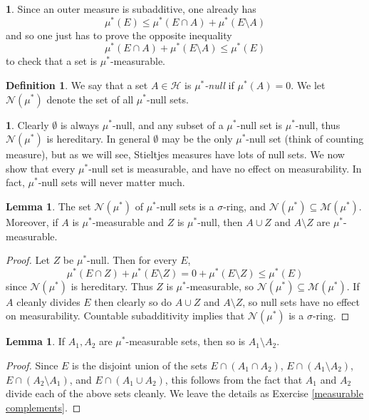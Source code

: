 \documentclass[12pt]{book}
\newcommand{\dfn}[1]{\emph{#1}\index{#1}}
\theoremstyle{definition}
\newtheorem{lemma}[theorem]{Lemma}
\newtheorem{subsec}[theorem]{}
\newtheorem{definition}[theorem]{Definition}
\begin{document}
\begin{subsec}
Since an outer measure is subadditive, one already has
$$\mu^*(E) \leq \mu^*(E \cap A) + \mu^*(E \setminus A)$$
and so one just has to prove the opposite inequality
\begin{equation}
\label{Caratheodory inequality}
\mu^*(E \cap A) + \mu^*(E \setminus A) \leq \mu^*(E)
\end{equation}
to check that a set is $\mu^*$-measurable.
\end{subsec}

\begin{definition}
We say that a set $A \in \mathcal H$ is \dfn{$\mu^*$-null} if $\mu^*(A) = 0$.
We let $\mathcal N(\mu^*)$ denote the set of all $\mu^*$-null sets.
\end{definition}

\begin{subsec}
Clearly $\emptyset$ is always $\mu^*$-null, and any subset of a $\mu^*$-null set is $\mu^*$-null, thus $\mathcal N(\mu^*)$ is hereditary.
In general $\emptyset$ may be the only $\mu^*$-null set (think of counting measure), but as we will see, Stieltjes measures have lots of null sets.
We now show that every $\mu^*$-null set is measurable, and have no effect on measurability.
In fact, $\mu^*$-null sets will never matter much.
\end{subsec}

\begin{lemma}
The set $\mathcal N(\mu^*)$ of $\mu^*$-null sets is a $\sigma$-ring, and $\mathcal N(\mu^*) \subseteq \mathcal M(\mu^*)$.
Moreover, if $A$ is $\mu^*$-measurable and $Z$ is $\mu^*$-null, then $A \cup Z$ and $A \setminus Z$ are $\mu^*$-measurable.
\end{lemma}
\begin{proof}
Let $Z$ be $\mu^*$-null. Then for every $E$,
$$\mu^*(E \cap Z) + \mu^*(E \setminus Z) = 0 + \mu^*(E \setminus Z) \leq \mu^*(E)$$
since $\mathcal N(\mu^*)$ is hereditary.
Thus $Z$ is $\mu^*$-measurable, so $\mathcal N(\mu^*) \subseteq \mathcal M(\mu^*)$.
If $A$ cleanly divides $E$ then clearly so do $A \cup Z$ and $A \setminus Z$, so null sets have no effect on measurability.
Countable subadditivity implies that $\mathcal N(\mu^*)$ is a $\sigma$-ring.
\end{proof}

\begin{lemma}
\label{measurable complements lemma}
If $A_1, A_2$ are $\mu^*$-measurable sets, then so is $A_1 \setminus A_2$.
\end{lemma}
\begin{proof}
Since $E$ is the disjoint union of the sets $E \cap (A_1 \cap A_2)$, $E \cap (A_1 \setminus A_2)$, $E \cap (A_2 \setminus A_1)$, and $E \cap (A_1 \cup A_2)$, this follows from the fact that $A_1$ and $A_2$ divide each of the above sets cleanly.
We leave the details as Exercise \ref{measurable complements}.
\end{proof}
\end{document}
